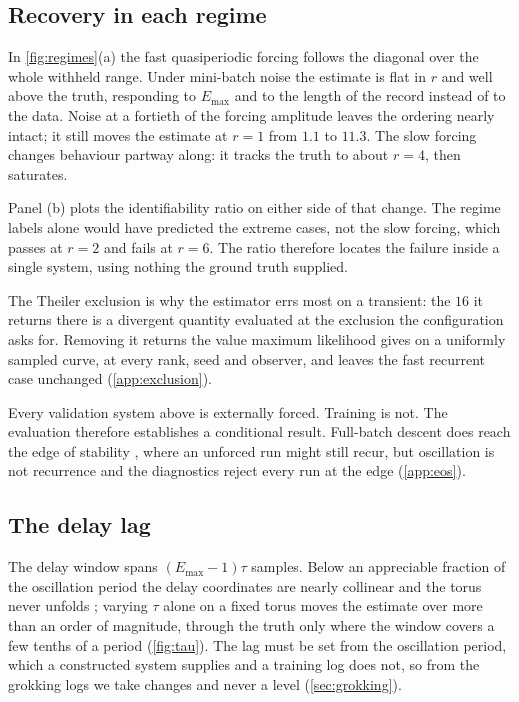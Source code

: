 \documentclass{article}
\begin{document}
\subsection{Recovery in each regime}\label{sec:regime}

In \cref{fig:regimes}(a) the fast quasiperiodic forcing follows the diagonal over the whole withheld range. Under
mini-batch noise the estimate is flat in $r$ and well above the truth, responding to $E_{\max}$ and
to the length of the record instead of to the data. Noise at a fortieth of the forcing amplitude
leaves the ordering nearly intact; it still moves the estimate at $r = 1$ from $1.1$ to $11.3$.
The slow forcing changes behaviour partway along: it tracks the truth to about $r = 4$, then
saturates.

Panel (b) plots the identifiability ratio on either side of that change. The regime labels alone
would have predicted the extreme cases, not the slow
forcing, which passes at $r = 2$ and fails at
$r = 6$. The ratio therefore locates the failure inside a single system, using nothing the ground
truth supplied.

The Theiler exclusion is why the estimator errs most on a transient: the $16$ it returns there is a
divergent quantity evaluated at the exclusion the configuration asks for. Removing it returns the
value maximum likelihood gives on a uniformly sampled curve, at every rank, seed and observer, and
leaves the fast recurrent case unchanged (\cref{app:exclusion}).

Every validation system above is externally forced. Training is not. The evaluation therefore establishes a conditional result.
Full-batch descent does reach the edge of stability \citep{cohen2021gradient}, where an unforced
run might still recur, but oscillation is not recurrence and the diagnostics reject every run at
the edge (\cref{app:eos}).

\subsection{The delay lag}\label{sec:tau}

The delay window spans $(E_{\max}-1)\tau$ samples. Below an appreciable fraction of the oscillation
period the delay coordinates are nearly collinear and the torus never unfolds
\citep{casdagli1991state}; varying $\tau$ alone on a fixed torus moves the estimate over more than
an order of magnitude, through the truth only where the window covers a few tenths of a period
(\cref{fig:tau}). The lag must be set from the oscillation period, which a constructed system
supplies and a training log does not, so from the grokking logs we take changes and never a
level (\cref{sec:grokking}).
\end{document}
